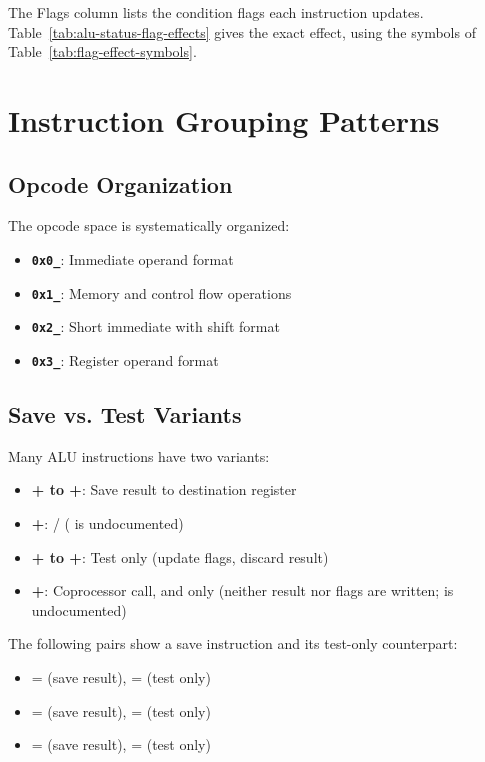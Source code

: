 The Flags column lists the condition flags each instruction updates. Table~\ref{tab:alu-status-flag-effects} gives the
exact effect, using the symbols of Table~\ref{tab:flag-effect-symbols}.

\section{Instruction Grouping Patterns}

\subsection{Opcode Organization}

The opcode space is systematically organized:

\begin{itemize}
	\item \textbf{\texttt{0x0\_}}: Immediate operand format
	\item \textbf{\texttt{0x1\_}}: Memory and control flow operations
	\item \textbf{\texttt{0x2\_}}: Short immediate with shift format
	\item \textbf{\texttt{0x3\_}}: Register operand format
\end{itemize}

\subsection{Save vs. Test Variants}

Many ALU instructions have two variants:

\begin{itemize}
	\item \textbf{+ to +}: Save result to destination register
	\item \textbf{+}: / ( is undocumented)
	\item \textbf{+ to +}: Test only (update flags, discard result)
	\item \textbf{+}: Coprocessor call,  and  only (neither result nor flags are written;  is undocumented)
\end{itemize}

The following pairs show a save instruction and its test-only counterpart:

\begin{itemize}
	\item {} =  (save result),  =  (test only)
	\item {} =  (save result),  =  (test only)
	\item {} =  (save result),  =  (test only)
\end{itemize}

